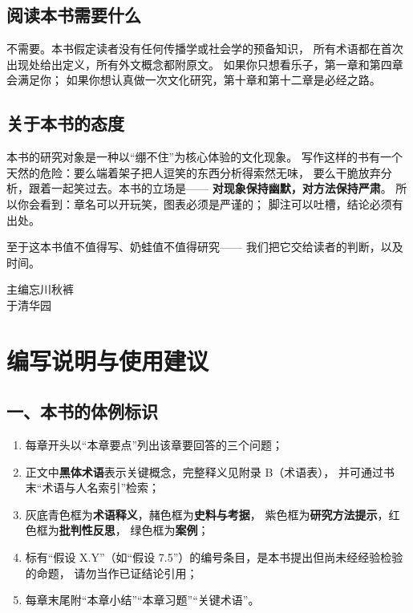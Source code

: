 \section*{阅读本书需要什么}

不需要。本书假定读者没有任何传播学或社会学的预备知识，
所有术语都在首次出现处给出定义，所有外文概念都附原文。
如果你只想看乐子，第一章和第四章会满足你；
如果你想认真做一次文化研究，第十章和第十二章是必经之路。

\section*{关于本书的态度}

本书的研究对象是一种以“绷不住”为核心体验的文化现象。
写作这样的书有一个天然的危险：要么端着架子把人逗笑的东西分析得索然无味，
要么干脆放弃分析，跟着一起笑过去。本书的立场是——
\textbf{对现象保持幽默，对方法保持严肃}。
所以你会看到：章名可以开玩笑，图表必须是严谨的；
脚注可以吐槽，结论必须有出处。

至于这本书值不值得写、奶蛙值不值得研究——
我们把它交给读者的判断，以及时间。

\vspace{2em}
\begin{flushright}
主编\quad 忘川秋裤\\
\BookDate\quad 于清华园
\end{flushright}

\clearpage

\chapter*{编写说明与使用建议}

\section*{一、本书的体例标识}

\begin{nlkeypoints}
  \begin{enumerate}[label=(\arabic*),leftmargin=2.4em]
    \item 每章开头以“本章要点”列出该章要回答的三个问题；
    \item 正文中\textbf{黑体术语}表示关键概念，完整释义见附录 B（术语表），
          并可通过书末“术语与人名索引”检索；
    \item 灰底青色框为\textbf{术语释义}，赭色框为\textbf{史料与考据}，
          紫色框为\textbf{研究方法提示}，红色框为\textbf{批判性反思}，
          绿色框为\textbf{案例}；
    \item 标有“假设 X.Y”（如“假设 7.5”）的编号条目，是本书提出但尚未经经验检验的命题，
          请勿当作已证结论引用；
    \item 每章末尾附“本章小结”“本章习题”“关键术语”。
  \end{enumerate}
\end{nlkeypoints}

